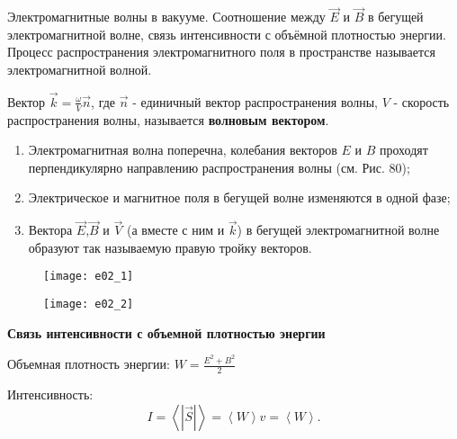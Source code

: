 \documentclass[__main__.tex]{subfiles}
\begin{document}
Электромагнитные волны в вакууме. Соотношение между $\vec{E}$ и $\vec{B}$ в бегущей электромагнитной волне, связь интенсивности с объёмной плотностью энергии.\\ 

Процесс распространения электромагнитного поля в пространстве называется электромагнитной волной. 

\begin{definition}
Вектор $\vec{k} = \frac{\omega}{V} \vec{n}$, где $\vec{n}$ - единичный вектор распространения волны, $V$ - скорость распространения волны, называется \textbf{волновым вектором}.
\end{definition}


\begin{enumerate}
\item
Электромагнитная волна поперечна, колебания векторов $E$ и $B$ проходят перпендикулярно направлению распространения волны (см. Рис. 80);
\item
Электрическое и магнитное поля в бегущей волне изменяются в одной фазе;
\item
Вектора $\vec{E}$,$\vec{B}$ и $\vec{V}$ (а вместе с ним и $\vec{k}$) в бегущей электромагнитной волне образуют так называемую правую тройку векторов.
\end{enumerate}

\begin{figure}[h]
\begin{minipage}{.45\linewidth}
    \texttt{[image: e02\_1]}
\end{minipage}
\hfill
\begin{minipage}{.45\linewidth}
    \texttt{[image: e02\_2]}
\end{minipage}
\end{figure}

\textbf{Связь интенсивности с объемной плотностью энергии}

Объемная плотность энергии: $W = \frac{E^2 + B^2}{2}$

Интенсивность:
$$
I=\left<|\vec{S}|\right>=\left<W\right>v=\left<W\right>.
$$
\end{document}

